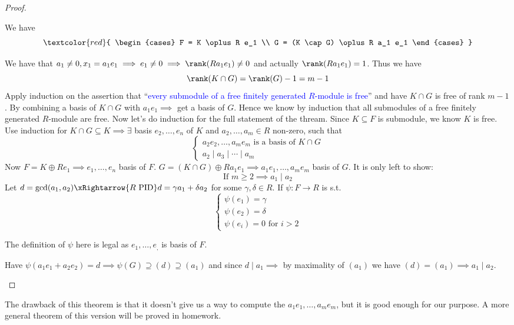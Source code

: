 \begin{proof}
\begin{enumerate}
		      \begin{conclusion}
			      We have
			      \[
				      \textcolor{red}{
					      \begin{cases}
						      F = K \oplus R e_1 \\
						      G = (K \cap G) \oplus R a_1 e_1
					      \end{cases}
				      }
			      \]
		      \end{conclusion}
		      We have that \( a_1 \ne 0, x_1 = a_1 e_1 \implies e_1 \ne 0 \implies \rank(Ra_1 e_1) \ne
		      0\) and actually \( \rank(R a_1 e_1 ) = 1 \). Thus we have
		      \[
			      \rank(K \cap G) = \rank(G) - 1 = m - 1
		      \]
		      Apply induction on the assertion that ``\textcolor{blue}{every submodule of a free finitely generated
			      \( R \)-module is free}'' and have \( K \cap G \) is free of rank \( m - 1 \). By
		      combining a basis of \( K \cap G \) with \( a_1 e_1 \implies \) get a basis of \( G
		      \). Hence we know by induction that all submodules of a free finitely generated \( R \)-module
		      are free. Now let's do induction for the full statement of the thream. Since \( K
		      \subseteq F \) is submodule, we know \( K \) is free. Use induction for \( K \cap G
		      \subseteq K \implies \exists \) basis \( e_2, \ldots, e_n \) of \( K \) and \(
		      a_2,\ldots, a_m \in R \) non-zero, such that
		      \[
			      \begin{cases}
				      a_2 e_2,\ldots, a_m e_m \text{ is a basis of } K \cap G \\
				      a_2 \mid a_3 \mid \cdots \mid a_m
			      \end{cases}
		      \]
		      Now \( F = K \oplus Re_1 \implies e_1,\ldots, e_n \) basis of \( F \). \( G = (K \cap
		      G)  \oplus R a_1 e_1 \implies a_1 e_1,\ldots, a_m e_m\) basis of \( G \). It is only
		      left to show:
		      \[
			      \text{If } m\geq 2 \implies a_1 \mid a_2
		      \]
		      Let \( d = \gcd(a_1,a_2) \xRightarrow{R \text{ PID}} d = \gamma a_1 + \delta a_2\) for
		      some \( \gamma, \delta \in R \). If \(
		      \psi: F \to R\) is s.t.
		      \[
			      \begin{cases}
				      \psi(e_1) = \gamma \\
				      \psi(e_2) = \delta \\
				      \psi(e_i) = 0 \text{ for } i > 2
			      \end{cases}
		      \]

		      \begin{note}
			      The definition of \( \psi \) here is legal as \( e_1,\ldots, e_, \) is basis of \( F \).
		      \end{note}
		      Have \( \psi(a_1 e_1 + a_2 e_2) = d \implies \psi(G) \supseteq (d)\supseteq (a_1) \) and
		      since \( d \mid a_1 \implies \) by maximality of \( (a_1) \) we have \( (d) = (a_1)
		      \implies a_1 \mid a_2 \).
	\end{enumerate}
\end{proof}
The drawback of this theorem is that it doesn't give us a way to compute the \( a_1 e_1,\ldots,
a_m e_m \), but it is
good enough for our purpose. A more general theorem of this version will be proved in
homework.

